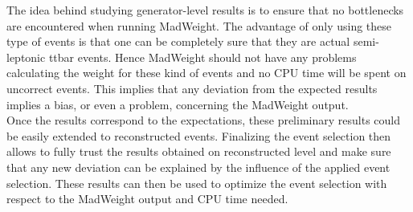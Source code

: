 
The idea behind studying generator-level results is to ensure that no bottlenecks are encountered when running MadWeight.
The advantage of only using these type of events is that one can be completely sure that they are actual semi-leptonic ttbar events. Hence MadWeight should not have any problems calculating the weight for these kind of events and no CPU time will be spent on uncorrect events.
This implies that any deviation from the expected results implies a bias, or even a problem, concerning the MadWeight output.\\

Once the results correspond to the expectations, these preliminary results could be easily extended to reconstructed events. Finalizing the event selection then allows to fully trust the results obtained on reconstructed level and make sure that any new deviation can be explained by the influence of the applied event selection.
These results can then be used to optimize the event selection with respect to the MadWeight output and CPU time needed.
%

